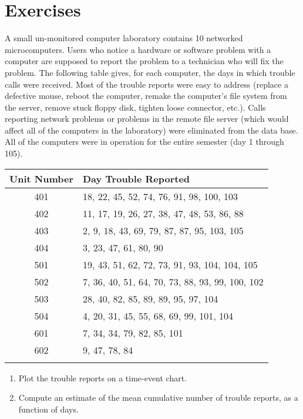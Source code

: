 \section*{Exercises}
\begin{exercise}
A small un-monitored computer laboratory contains 10 networked
microcomputers. Users who notice a hardware or software problem with
a computer are supposed to report the problem to a technician who
will fix the problem.  The following table gives, for each computer,
the days in which trouble calls were received. Most of the trouble
reports were easy to address (replace a defective mouse, reboot
the computer, remake the computer's file system from the server, remove
stuck floppy disk, tighten loose connector, etc.). Calls reporting
network problems or problems in the remote file server (which would
affect all of the computers in the laboratory) were eliminated from
the data base. All of the computers were in operation for the entire
semester (day 1 through 105).
\\[3ex]
\begin{center}
\begin{tabular}{cl}
\hline
Unit Number &  Day Trouble Reported\\
\hline
401 & 18, 22, 45, 52, 74, 76, 91, 98, 100, 103\\
402 & 11,  17,  19,  26,  27,  38,  47,  48,  53, 86,  88\\
403  & 2, 9,  18,  43,  69,  79,  87,  87,  95, 103, 105\\
404 & 3,  23,  47,  61,  80,  90\\
501 & 19,  43,  51,  62,  72,  73,  91,  93, 104, 104, 105\\
502 & 7,  36, 40,  51,  64,  70,  73,  88,  93,  99, 100, 102\\
503 & 28,  40,  82,  85,  89,  89,  95, 97, 104\\
504 & 4,  20, 31,  45,  55,  68,  69,  99, 101, 104\\
601 & 7,  34,  34,  79,  82,  85, 101 \\
602 & 9,  47, 78,  84 \\
\hline
\\[2ex]
\end{tabular}
\end{center}
\begin{enumerate}
\item
Plot the trouble reports on a time-event chart.
\item
Compute an estimate of the mean cumulative number of trouble reports,
as a function of days.

\end{enumerate}
\end{exercise}
